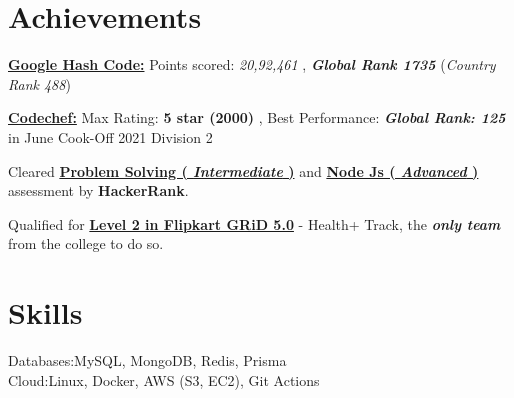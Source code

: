 \documentclass[]{resume-openfont}
\begin{document}
\section{Achievements}
\begin{bullets}
    \item  \textbf{\href{https://drive.google.com/file/d/1PHLWF7olshOeVYCrIPq_-AS-QvxKBV9m/view?usp=sharing}{Google Hash Code:}} Points scored: \textit{20,92,461} , \textbf{\textit{ Global Rank 1735}} (\textit{Country Rank 488})
    \item  \textbf{\href{https://www.codechef.com/users/mrsayan/}{Codechef:}} Max Rating: \textbf{5 star (2000)} , Best Performance: \textbf{\textit{Global Rank: 125}} in June Cook-Off 2021 Division 2
    \item Cleared \textbf{\href{https://www.hackerrank.com/certificates/4099d9ae927f}{Problem Solving ( \textit{Intermediate} )}} and \textbf{\href{https://www.hackerrank.com/certificates/5ce743e1535f}{Node Js ( \textit{Advanced} )}} assessment by \textbf{HackerRank}.
    \item 
    Qualified for \textbf{\href{https://drive.google.com/file/d/1nG47kEjyQut83Ep9Tz-li2tB_1fTugOQ/view?usp=sharing}{Level 2 in Flipkart GRiD 5.0}} - Health+ Track, the \textbf{\textit{only team}} from the college to do so.
\end{bullets}
\sectionsep

\section{Skills}

\begin{skillList}
    {Databases:}{MySQL, MongoDB, Redis, Prisma}
    \\
    {Cloud:}{Linux, Docker, AWS (S3, EC2), Git Actions}%
    \\
    
\end{skillList}
\end{document}
